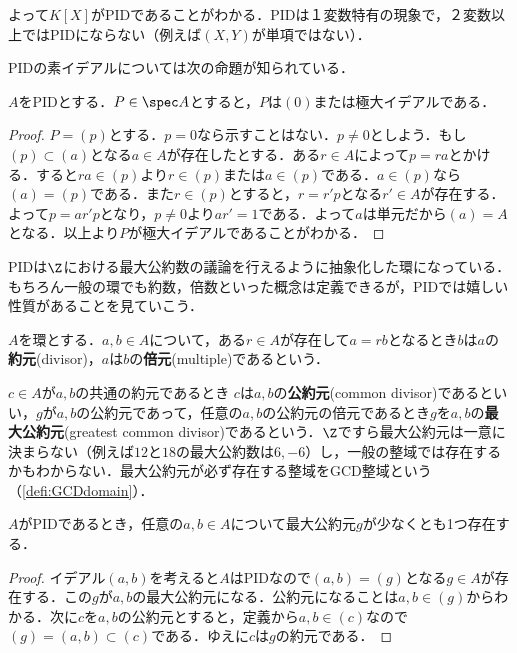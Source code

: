 よって$K[X]$がPIDであることがわかる．PIDは１変数特有の現象で，２変数以上ではPIDにならない（例えば$(X,Y)$が単項ではない）．

PIDの素イデアルについては次の命題が知られている．
\begin{prop}
	$A$をPIDとする．$P\in\spec A$とすると，$P$は$(0)$または極大イデアルである．
\end{prop}
\begin{proof}
	$P=(p)$とする．$p=0$なら示すことはない．$p\neq0$としよう．もし$(p)\subset (a)$となる$a\in A$が存在したとする．ある$r\in A$によって$p=ra$とかける．すると$ra\in (p)$より$r\in (p)$または$a\in (p)$である．$a\in (p)$なら$(a)=(p)$である．また$r\in (p)$とすると，$r=r'p$となる$r'\in A$が存在する．よって$p=ar'p$となり，$p\neq0$より$ar'=1$である．よって$a$は単元だから$(a)=A$となる．以上より$P$が極大イデアルであることがわかる．
\end{proof}

PIDは$\Z$における最大公約数の議論を行えるように抽象化した環になっている．もちろん一般の環でも約数，倍数といった概念は定義できるが，PIDでは嬉しい性質があることを見ていこう．

\begin{defi}[約元，倍元]
	$A$を環とする．$a,b\in A$について，ある$r\in A$が存在して$a=rb$となるとき$b$は$a$の\textbf{約元}(divisor)，$a$は$b$の\textbf{倍元}(multiple)であるという．
\end{defi}

$c\in A$が$a,b$の共通の約元であるとき $c$は$a,b$の\textbf{公約元}(common divisor)であるといい，$g$が$a,b$の公約元であって，任意の$a,b$の公約元の倍元であるとき$g$を$a,b$の\textbf{最大公約元}(greatest common divisor)であるという．$\Z$ですら最大公約元は一意に決まらない（例えば$12$と$18$の最大公約数は$6,-6$）し，一般の整域では存在するかもわからない．最大公約元が必ず存在する整域をGCD整域という（\ref{defi:GCDdomain}）．

\begin{prop}\label{prop:PIDはGCD}
	$A$がPIDであるとき，任意の$a,b\in A$について最大公約元$g$が少なくとも1つ存在する．
\end{prop}

\begin{proof}
	イデアル$(a,b)$を考えると$A$はPIDなので$(a,b)=(g)$となる$g\in A$が存在する．この$g$が$a,b$の最大公約元になる．公約元になることは$a,b\in(g)$からわかる．次に$c$を$a,b$の公約元とすると，定義から$a,b\in (c)$なので$(g)=(a,b)\subset (c)$である．ゆえに$c$は$g$の約元である．
\end{proof}


